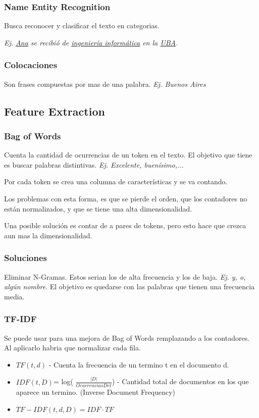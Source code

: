 \documentclass[titlepage,a4paper]{article}
\begin{document}
\subsubsection*{Name Entity Recognition}
Busca reconocer y clasificar el texto en categorias.

\textit{Ej. \underline{Ana} se recibió de \underline{ingeniería informática} en la \underline{UBA}.}

\subsubsection*{Colocaciones}
Son frases compuestas por mas de una palabra. \textit{Ej. Buenos Aires}

\subsection{Feature Extraction}
\subsubsection*{Bag of Words}
Cuenta la cantidad de ocurrencias de un token en el texto. El objetivo que tiene es buscar palabras distintivas. \textit{Ej. Excelente, buenísimo,...}

Por cada token se crea una columna de características y se va contando.

Los problemas con esta forma, es que se pierde el orden, que los contadores no están normalizados, y que se tiene una alta dimensionalidad.

Una posible solución es contar de a pares de tokens, pero esto hace que crezca aun mas la dimensionalidad.

\subsubsection*{Soluciones}
Eliminar N-Gramas. Estos serian los de alta frecuencia y los de baja. \textit{Ej. y, o, algún nombre}. El objetivo es quedarse con las palabras que tienen una frecuencia media.


\subsubsection*{TF-IDF}
Se puede usar para una mejora de Bag of Words remplazando a los contadores. Al aplicarlo habria que normalizar cada fila.
\begin{itemize}
\item $TF(t,d)$ - Cuenta la frecuencia de un termino t en el documento d.
\item $IDF(t,D)$= log( $\frac{|D|}{Ocurrencias De t} $) - Cantidad total de documentos en los que aparece un termino. (Inverse Document Frequency)
\item $TF-IDF(t,d,D) = IDF \cdot TF$
\end{itemize}
\end{document}
